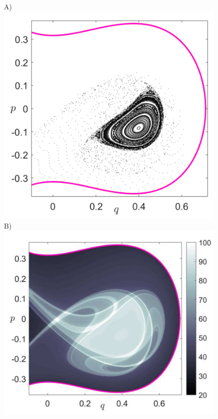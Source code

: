 \documentclass{ws-ijbc}
\begin{document}
\begin{figure}[!ht]
	\begin{center}		
		A)\includegraphics[scale=0.42]{fig12a}
		B)\includegraphics[scale=0.42]{fig12b}

\end{center}
\end{figure}
\end{document}
